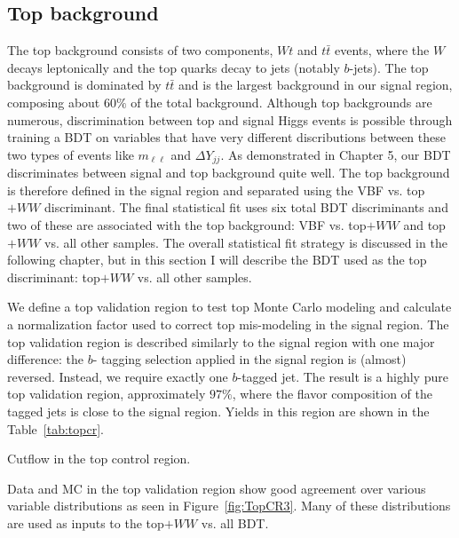 \subsection{Top background}
The top background consists of two components, $Wt$ and $t\bar{t}$ events, where the $W$ decays leptonically and the top quarks decay to jets (notably $b$-jets). The top background is dominated by $t\bar{t}$ and is the largest background in our signal region, composing about $60\%$ of the total background. Although top backgrounds are numerous, discrimination between top and signal Higgs events is possible through training a BDT on variables that have very different discributions between these two types of events like $m_{\ell\ell}$ and $\Delta Y_{jj}$. As demonstrated in Chapter 5, our BDT discriminates between signal and top background quite well. The top background is therefore defined in the signal region and separated using the VBF vs. top$+WW$ discriminant. The final statistical fit uses six total BDT discriminants and two of these are associated with the top background: VBF vs. top$+WW$ and top$+WW$ vs. all other samples. The overall statistical fit strategy is discussed in the following chapter, but in this section I will describe the BDT used as the top discriminant: top$+WW$ vs. all other samples. 

We define a top validation region to test top Monte Carlo modeling and calculate a normalization factor used to correct top mis-modeling in the signal region. The top validation region is described similarly to the signal region with one major difference: the $b$- tagging selection applied in the signal region is (almost) reversed. Instead, we require exactly one $b$-tagged jet. The result is a highly pure top validation region, approximately $97\%$, where the flavor composition of the tagged jets is close to the signal region. Yields in this region are shown in the Table~\ref{tab:topcr}.

\begin{table}[h!]
\centering
\resizebox{\textwidth}{!}{
}
\caption{Cutflow in the top control region.}
\label{tab:topcr}
\end{table}

Data and MC in the top validation region show good agreement over various variable distributions as seen in Figure~\ref{fig:TopCR3}. Many of these distributions are used as inputs to the top$+WW$ vs. all BDT. 

